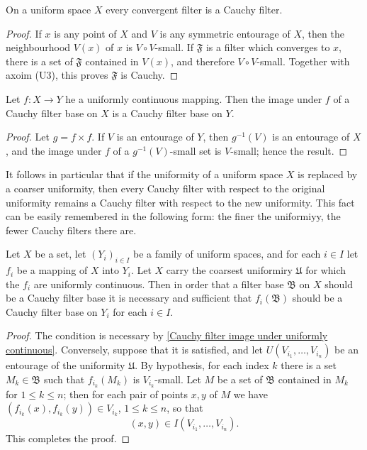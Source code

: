 \begin{proposition}\label{filter convergent is Cauchy}
On a uniform space $X$ every convergent filter is a Cauchy filter.
\end{proposition}
\begin{proof}
If $x$ is any point of $X$ and $V$ is any symmetric entourage of $X$, then the neighbourhood $V(x)$ of $x$ is $V\circ V$-small. If $\mathfrak{F}$ is a filter which converges to $x$, there is a set of $\mathfrak{F}$ contained in $V(x)$, and therefore $V\circ V$-small. Together with axoim (U3), this proves $\mathfrak{F}$ is Cauchy.
\end{proof}
\begin{proposition}\label{Cauchy filter image under uniformly continuous}
Let $f:X\to Y$ he a uniformly continuous mapping. Then the image under $f$ of a Cauchy filter base on $X$ is a Cauchy filter base on $Y$.
\end{proposition}
\begin{proof}
Let $g=f\times f$. If $V$ is an entourage of $Y$, then $g^{-1}(V)$ is an entourage of $X$, and the image under $f$ of a $g^{-1}(V)$-small set is $V$-small; hence the result.
\end{proof}
It follows in particular that if the uniformity of a uniform space $X$ is replaced by a coarser uniformity, then every Cauchy filter with respect to the original uniformity remains a Cauchy filter with respect to the new uniformity. This fact can be easily remembered in the following form: the finer the uniformiyy, the fewer Cauchy filters there are.
\begin{proposition}\label{filter Cauchy on initial topology iff}
Let $X$ be a set, let $(Y_i)_{i\in I}$ be a family of uniform spaces, and for each $i\in I$ let $f_i$ be a mapping of $X$ into $Y_i$. Let $X$ carry the coarsest uniformiry $\mathfrak{U}$ for which the $f_i$ are uniformly continuous. Then in order that a filter base $\mathfrak{B}$ on $X$ should be a Cauchy filter base it is necessary and sufficient that $f_i(\mathfrak{B})$ should be a Cauchy filter base on $Y_i$ for each $i\in I$.
\end{proposition}
\begin{proof}
The condition is necessary by \cref{Cauchy filter image under uniformly continuous}. Conversely, suppose that it is satisfied, and let $U(V_{i_1},\dots,V_{i_n})$ be an entourage of the uniformity $\mathfrak{U}$. By hypothesis, for each index $k$ there is a set $M_k\in\mathfrak{B}$ such that $f_{i_k}(M_k)$ is $V_{i_k}$-small. Let $M$ be a set of $\mathfrak{B}$ contained in $M_k$ for $1\leq k\leq n$; then for each pair of points $x,y$ of $M$ we have $(f_{i_k}(x),f_{i_k}(y))\in V_{i_k}$, $1\leq k\leq n$, so that
\[(x,y)\in I(V_{i_1},\dots,V_{i_n}).\]
This completes the proof.
\end{proof}
